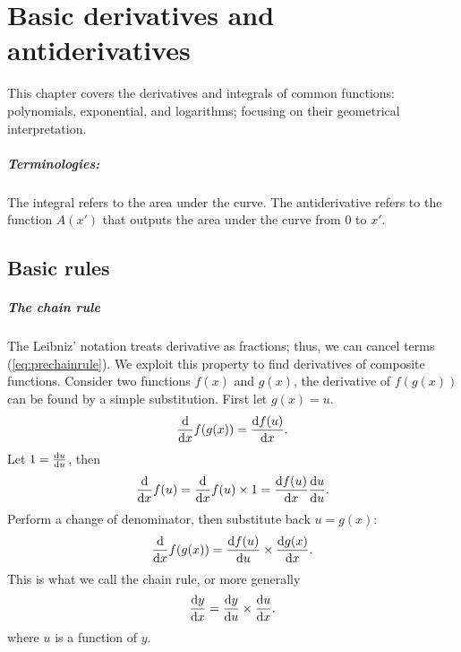\chapter{Basic derivatives and antiderivatives}
\label{sec:basic_derivatives_and_integrals}

This chapter covers the derivatives and integrals of common functions: polynomials, exponential, and logarithms; focusing on their geometrical interpretation.


\paragraph{Terminologies:} The integral refers to the area under the curve. The antiderivative refers to the function $A(x')$ that outputs the area under the curve from $0$ to $x'$.

\section{Basic rules}
\label{sec:trivial_rules}

\paragraph{The chain rule} The Leibniz' notation treats derivative as fractions; thus, we can cancel terms (\cref{eq:prechainrule}). We exploit this property to find derivatives of composite functions. Consider two functions $f(x)$ and $g(x)$, the derivative of $f(g(x))$ can be found by a simple substitution. First let $g(x) = u$.
\begin{equation*}
	\odv*{f(g(x))}{x} = \odv{f(u)}{x}.
\end{equation*}
Let $1 = \odv{u}{u}$, then
\begin{equation*}
	\odv*{f(u)}{x} = \odv*{f(u)}{x} \times 1 = \odv{f(u)}{x} \odv{u}{u}.
\end{equation*}
Perform a change of denominator, then substitute back $u = g(x)$:
\begin{equation*}
	\odv*{f(g(x))}{x} = \odv{f(u)}{u} \times \odv{g(x)}{x}.
\end{equation*}
This is what we call the chain rule, or more generally
\begin{equation}
    \odv{y}{x} = \odv{y}{u} \times \odv{u}{x}. \label{eq:chainrule}
\end{equation}
where $u$ is a function of $y$.

